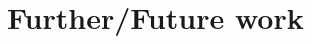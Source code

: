 \documentclass[8pt,aspectratio=169]{beamer}
\begin{document}










\section{Further/Future work}
\end{document}
